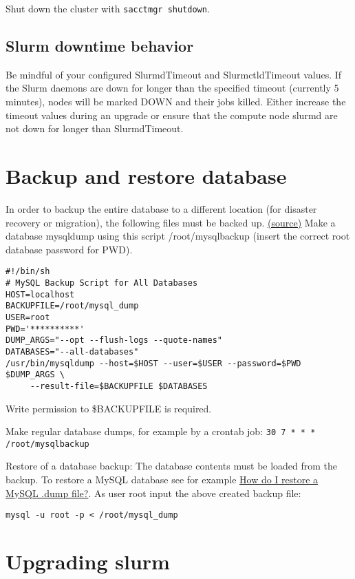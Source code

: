 Shut down the cluster with \texttt{sacctmgr shutdown}. 

\subsection{Slurm downtime behavior} \label{subsec:slurmdowntime}
Be mindful of your configured SlurmdTimeout and SlurmctldTimeout values. If the Slurm daemons are down for longer than the specified timeout (currently 5 minutes), nodes will be marked DOWN and their jobs killed. Either increase the timeout values during an upgrade or ensure that the compute node slurmd are not down for longer than SlurmdTimeout. 

\section{Backup and restore database} \label{sec:slurmDBbackup}

In order to backup the entire database to a different location (for disaster recovery or migration), the following files must be backed up. \href{https://wiki.fysik.dtu.dk/niflheim/Slurm_database#backup-and-restore-of-database}{(source)} Make a database mysqldump using this script /root/mysqlbackup (insert the correct root database password for PWD). 

\begin{verbatim}
#!/bin/sh
# MySQL Backup Script for All Databases
HOST=localhost
BACKUPFILE=/root/mysql_dump
USER=root
PWD='**********'
DUMP_ARGS="--opt --flush-logs --quote-names"
DATABASES="--all-databases"
/usr/bin/mysqldump --host=$HOST --user=$USER --password=$PWD $DUMP_ARGS \
     --result-file=$BACKUPFILE $DATABASES
\end{verbatim}

Write permission to \$BACKUPFILE is required.

Make regular database dumps, for example by a crontab job:
\texttt{30 7 * * * /root/mysqlbackup}

Restore of a database backup: The database contents must be loaded from the backup. To restore a MySQL database see for example \href{http://stackoverflow.com/questions/105776/how-do-i-restore-a-mysql-dump-file}{How do I restore a MySQL .dump file?}. As user root input the above created backup file:

\texttt{mysql -u root -p < /root/mysql\_dump}

\section{Upgrading slurm} \label{sec:slurmupgrade}

